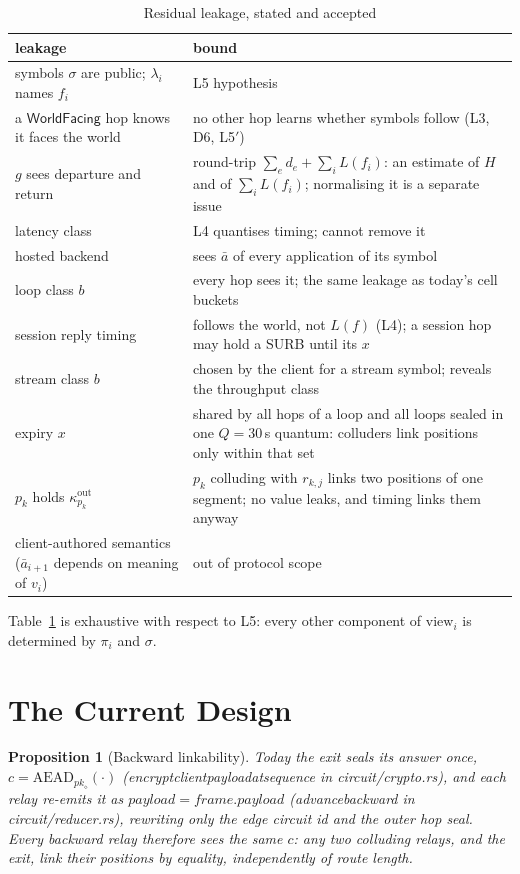\documentclass[journal]{IEEEtran}
\newtheorem{proposition}{Proposition}
\newcommand{\WF}{\mathsf{WorldFacing}}
\newcommand{\cl}{\diamond}
\newcommand{\view}{\mathrm{view}}
\DeclareRobustCommand{\code}[1]{{\ttfamily\renewcommand{\_}{\textunderscore\allowbreak}#1}}
\begin{document}
\begin{table}[t]
\caption{Residual leakage, stated and accepted}
\label{tab:leak}
\centering\small
\begin{tabular}{@{}>{\raggedright\arraybackslash}p{}>{\raggedright\arraybackslash}p{}@{}}
\toprule
leakage & bound \\
\midrule
symbols $\sigma$ are public; $\lambda_i$ names $f_i$ & L5 hypothesis \\
a $\WF$ hop knows it faces the world & no other hop learns whether symbols follow (L3, D6, L5$'$) \\
$g$ sees departure and return & round-trip $\sum_e d_e+\sum_i L(f_i)$: an estimate of $H$ and of $\sum_i L(f_i)$; normalising it is a separate issue \\
latency class & L4 quantises timing; cannot remove it \\
hosted backend & sees $\bar a$ of every application of its symbol \\
loop class $b$ & every hop sees it; the same leakage as today's cell buckets \\
session reply timing & follows the world, not $L(f)$ (L4); a session hop may hold a SURB until its $x$ \\
stream class $b$ & chosen by the client for a stream symbol; reveals the throughput class \\
expiry $x$ & shared by all hops of a loop and all loops sealed in one $Q=30$\,s quantum: colluders link positions only within that set \\
$p_k$ holds $\kappa^{\mathrm{out}}_{p_k}$ & $p_k$ colluding with $r_{k,j}$ links two positions of one segment; no value leaks, and timing links them anyway \\
client-authored semantics ($\bar a_{i+1}$ depends on meaning of $v_i$) & out of protocol scope \\
\bottomrule
\end{tabular}
\end{table}

Table~\ref{tab:leak} is exhaustive with respect to L5: every other
component of $\view_i$ is determined by $\pi_i$ and $\sigma$.

\section{The Current Design}\label{sec:current}

\begin{proposition}[Backward linkability]\label{prop:current}
Today the exit seals its answer once,
$c=\mathrm{AEAD}_{\mathit{pk}_\cl}(\cdot)$
(\code{encrypt\_client\_payload\_at\_sequence} in
\code{circuit/crypto.rs}), and each relay re-emits it as
$\mathit{payload}=\mathit{frame.payload}$ (\code{advance\_backward} in
\code{circuit/reducer.rs}), rewriting only the edge circuit id and the
outer hop seal.  Every backward relay therefore sees the
same $c$: any two colluding relays, and the exit, link their positions by
equality, independently of route length.
\end{proposition}
\end{document}
